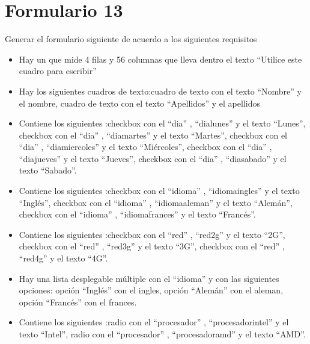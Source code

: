 \documentclass[letterpaper,10pt,spanish]{sphinxmanual}
\begin{document}
\section{Formulario 13}
\label{ejercicios/formularios/anexo_formularios:formulario-13}
Generar el formulario siguiente de acuerdo a los siguientes requisitos
\begin{itemize}
\item {} 
Hay un  que mide 4 filas y 56 columnas que lleva dentro el texto ``Utilice este cuadro para escribir''

\item {} 
Hay los siguientes cuadros de texto:cuadro de texto con el texto ``Nombre'' y el  nombre, cuadro de texto con el texto ``Apellidos'' y el  apellidos

\item {} 
Contiene los siguientes :checkbox con el   ``dia'' ,   ``dialunes''  y el texto ``Lunes'', checkbox con el   ``dia'' ,   ``diamartes''  y el texto ``Martes'', checkbox con el   ``dia'' ,   ``diamiercoles''  y el texto ``Miércoles'', checkbox con el   ``dia'' ,   ``diajueves''  y el texto ``Jueves'', checkbox con el   ``dia'' ,   ``diasabado''  y el texto ``Sabado''.

\item {} 
Contiene los siguientes :checkbox con el   ``idioma'' ,   ``idiomaingles''  y el texto ``Inglés'', checkbox con el   ``idioma'' ,   ``idiomaaleman''  y el texto ``Alemán'', checkbox con el   ``idioma'' ,   ``idiomafrances''  y el texto ``Francés''.

\item {} 
Contiene los siguientes :checkbox con el   ``red'' ,   ``red2g''  y el texto ``2G'', checkbox con el   ``red'' ,   ``red3g''  y el texto ``3G'', checkbox con el   ``red'' ,   ``red4g''  y el texto ``4G''.

\item {} 
Hay una lista desplegable múltiple con el  ``idioma'' y con las siguientes opciones: opción ``Inglés'' con el  ingles, opción ``Alemán'' con el  aleman, opción ``Francés'' con el  frances.

\item {} 
Contiene los siguientes :radio con el   ``procesador'' ,   ``procesadorintel''  y el texto ``Intel'', radio con el   ``procesador'' ,   ``procesadoramd''  y el texto ``AMD''.

\end{itemize}
\end{document}
